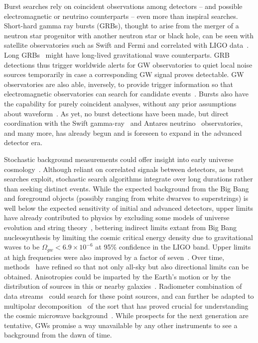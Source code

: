 Burst searches rely on coincident observations among detectors -- and possible electromagnetic or neutrino counterparts -- even more than inspiral searches.
Short-hard gamma ray bursts (GRBs), thought to arise from the merger of a neutron star progenitor with another neutron star or black hole, can be seen with satellite observatories such as Swift and Fermi and correlated with LIGO data~\cite{AbadieGRB2012}.
Long GRBs~\cite{AasiGRB2013} might have long-lived gravitational wave counterparts.
GRB detections thus trigger worldwide alerts for GW observatories to quiet local noise sources temporarily in case a corresponding GW signal proves detectable.
GW observatories are also able, inversely, to provide trigger information so that electromagnetic observatories can search for candidate events~\cite{AasiOpticalCounterpart2014}.
Bursts also have the capability for purely coincident analyses, without any prior assumptions about waveform~\cite{LIGOBurst2012}.
As yet, no burst detections have been made, but direct coordination with the Swift gamma-ray~\cite{Swift2012} and Antares neutrino~\cite{Antares2013} observatories, and many more, has already begun and is foreseen to expand in the advanced detector era.

Stochastic background measurements could offer insight into early universe cosmology~\cite{Grishchuk1974,Maggiore2000}.
Although reliant on correlated signals between detectors, as burst searches exploit, stochastic search algorithms integrate over long durations rather than seeking distinct events.
While the expected background from the Big Bang and foreground objects (possibly ranging from white dwarves to superstrings) is well below the expected sensitivity of initial and advanced detectors, upper limits have already contributed to physics by excluding some models of universe evolution and string theory~\cite{LIGOStochasticNature2009}, bettering indirect limits extant from Big Bang nucleosynthesis by limiting the cosmic critical energy density due to gravitational waves to be $\Omega_{gw} < 6.9\times 10^{-6}$ at 95\% confidence in the LIGO band.
Upper limits at high frequencies were also improved by a factor of seven~\cite{AbadiePRDStochastic2012}.
Over time, methods~\cite{Allen1999,FotopoulosThesis,Abbott2006,Abbott2007} have refined so that not only all-sky but also directional limits can be obtained.
Anisotropies could be imparted by the Earth's motion or by the distribution of sources in this or nearby galaxies~\cite{Allen1997}.
Radiometer combination of data streams~\cite{Radiometer2006} could search for these point sources, and can further be adapted to multipolar decomposition~\cite{MeadorsCaltech2007} of the sort that has proved crucial for understanding the cosmic microwave background~\cite{Muciaccia1997}.
While prospects for the next generation are tentative, GWs promise a way unavailable by any other instruments to see a background from the dawn of time.


